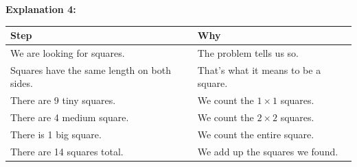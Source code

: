 \documentclass[noauthor,nooutcomes, handout]{ximera}
\begin{document}
\begin{mdframed}
{\bf Explanation 4:}

\begin{tabularx}{\textwidth}{X|X}
    Step & Why  \\ \hline \hline
    We are looking for squares. & The problem tells us so. \\ \hline
    Squares have the same length on both sides. & That's what it means to be a square. \\ \hline
    There are 9 tiny squares. & We count the $1\times 1$ squares. \\ \hline
    There are 4 medium square. & We count the $2 \times 2$ squares. \\ \hline
    There is 1 big square. & We count the entire square. \\ \hline
    There are 14 squares total. & We add up the squares we found. \\
\end{tabularx}
\end{mdframed}




\newpage
\end{document}

